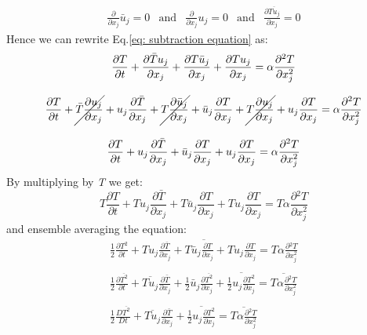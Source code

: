 \documentclass[11pt, a4paper]{article}
\newcommand{\parder}[2]{\frac{\partial {#1}}{\partial {#2}}}
\begin{document}
\begin{equation}
    \begin{matrix}
        \displaystyle\parder{}{x_j}\bar{u}_j=0 & \text{and} & \displaystyle\parder{}{x_j}u_j=0 & \text{and} & \displaystyle\parder{\overline{Tu_j}}{x_j}=0
    \end{matrix}
\end{equation}
Hence we can rewrite Eq.\ref{eq: subtraction equation} as:
\begin{equation}
    \begin{array}{c}
        \displaystyle \parder{T}{t}+\parder{\bar{T}u_j}{x_j}+\parder{T\bar{u}_j}{x_j}+\parder{Tu_j}{x_j}=\alpha\parder{^2T}{x^2_j} \\\\
        \displaystyle \parder{T}{t}+\cancel{\bar{T}\parder{u_j}{x_j}}+u_j\parder{\bar{T}}{x_j}+\cancel{T\parder{\bar{u}_j}{x_j}}+\bar{u}_j\parder{T}{x_j}+\cancel{T\parder{u_j}{x_j}}+u_j\parder{T}{x_j}=\alpha\parder{^2T}{x^2_j} \\\\
        \displaystyle \parder{T}{t}+u_j\parder{\bar{T}}{x_j}+\bar{u}_j\parder{T}{x_j}+u_j\parder{T}{x_j}=\alpha\parder{^2T}{x^2_j}
    \end{array}
\end{equation}
By multiplying by \emph{T} we get:
\begin{equation}
    \displaystyle T\parder{T}{t}+Tu_j\parder{\bar{T}}{x_j}+T\bar{u}_j\parder{T}{x_j}+Tu_j\parder{T}{x_j}=T\alpha\parder{^2T}{x^2_j}
\end{equation}
and ensemble averaging the equation:
\begin{equation}
    \begin{array}{c}
        \overline{\displaystyle \frac{1}{2}\parder{T^2}{t}+Tu_j\parder{\bar{T}}{x_j}+T\bar{u}_j\parder{T}{x_j}+Tu_j\parder{T}{x_j}=T\alpha\parder{^2T}{x^2_j}} \\\\
        \displaystyle\frac{1}{2}\parder{\overline{T^2}}{t}+\overline{Tu_j}\parder{\bar{T}}{x_j}+\frac{1}{2}\bar{u}_j\parder{\overline{T^2}}{x_j}+\overline{\frac{1}{2}u_j\parder{T^2}{x_j}}=\overline{T\alpha\parder{^2T}{x^2_j}} \\\\
        \displaystyle\frac{1}{2}\frac{D\overline{T^2}}{Dt}+\overline{Tu_j}\parder{\bar{T}}{x_j}+\overline{\frac{1}{2}u_j\parder{T^2}{x_j}}=\overline{T\alpha\parder{^2T}{x^2_j}}
    \end{array}
\end{equation}
\end{document}
